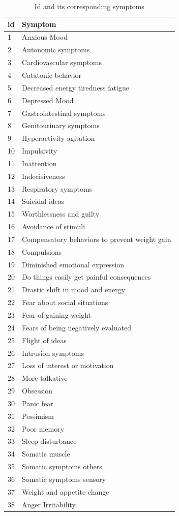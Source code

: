 \begin{table}[ht]
    \small
    \centering
    \begin{tabular}{m{0.4cm}m{6cm}}
    \hline
    id & Symptom  \\
    \hline
    1&Anxious Mood 	\\
    2&Autonomic symptoms	\\
    3&Cardiovascular symptoms		\\
    4&Catatonic behavior\\
    5&Decreased energy tiredness fatigue	\\
    6&Depressed Mood\\
    7&Gastrointestinal symptoms	\\
    8&Genitourinary symptoms	\\
    9&Hyperactivity agitation	\\
    10&Impulsivity		\\
    11&Inattention	\\
    12&Indecisiveness	\\
    13&Respiratory symptoms\\
    14&Suicidal ideas	\\
    15&Worthlessness and guilty	\\
    16&Avoidance of stimuli	\\
    17&Compensatory behaviors to prevent weight gain	\\
    18&Compulsions		\\
    19&Diminished emotional expression		\\
    20&Do things easily get painful consequences	\\
    21&Drastic shift in mood and energy	\\
    22&Fear about social situations	\\
    23&Fear of gaining weight	\\
    24&Fears of being negatively evaluated	\\
    25&Flight of ideas	\\
    26&Intrusion symptoms	\\
    27&Loss of interest or motivation	\\
    28&More talkative\\
    29&Obsession	\\
    30&Panic fear	\\
    31&Pessimism	\\
    32&Poor memory	\\
    33&Sleep disturbance	\\
    34&Somatic muscle		\\
    35&Somatic symptoms others		\\
    36&Somatic symptoms sensory	\\
    37&Weight and appetite change	\\
    38&Anger Irritability	\\
    \hline
    \end{tabular}
    \caption{Id and its corresponding symptoms}
    \label{tab:symp_id}
\end{table}

